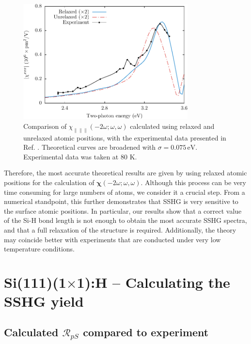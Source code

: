 \documentclass[11pt]{book}
\begin{document}
\begin{figure}
\centering
\includegraphics[width=0.8\textwidth]{../figures/04-results/fig-4_3_01}
\caption{Comparison of
$\chi_{\parallel\parallel\parallel}(-2\omega;\omega,\omega)$ calculated using
relaxed and unrelaxed atomic positions, with the experimental data presented in
Ref. \cite{hoferAPA96}. Theoretical curves are broadened with
$\sigma=0.075\,\text{eV}$. Experimental data was taken at 80 K.}
\label{fig:Xxxx}
\end{figure}

Therefore, the most accurate theoretical results are given by using relaxed
atomic positions for the calculation of
$\boldsymbol{\chi}(-2\omega;\omega,\omega)$. Although this process can be very
time consuming for large numbers of atoms, we consider it a crucial step. From a
numerical standpoint, this further demonstrates that SSHG is very sensitive to
the surface atomic positions. In particular, our results show that a correct
value of the Si-H bond length is not enough to obtain the most accurate SSHG
spectra, and that a full relaxation of the structure is required. 
Additionally, the theory may coincide better with experiments that are
conducted under very low temperature conditions.


\section{
\texorpdfstring{Si(111)(1$\times$1):H}{Si(111)(1x1):H} --
Calculating the SSHG yield
}

\subsection{Calculated \texorpdfstring{$\mathcal{R}_{pS}$}{RpS} compared to
experiment}\label{sec: RpS}
\end{document}
